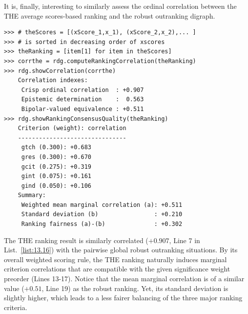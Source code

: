 It is, finally, interesting to similarly assess the ordinal correlation between the THE average scores-based ranking and the robust outranking digraph.
\begin{lstlisting}[caption={Computing the ordinal quality of the THE ranking},label=list:13.16]
>>> # theScores = [(xScore_1,x_1), (xScore_2,x_2),... ]
>>> # is sorted in decreasing order of xscores
>>> theRanking = [item[1] for item in theScores]
>>> corrthe = rdg.computeRankingCorrelation(theRanking)
>>> rdg.showCorrelation(corrthe)
    Correlation indexes:
     Crisp ordinal correlation  : +0.907
     Epistemic determination    :  0.563
     Bipolar-valued equivalence : +0.511
>>> rdg.showRankingConsensusQuality(theRanking)
    Criterion (weight): correlation
    -------------------------------
     gtch (0.300): +0.683
     gres (0.300): +0.670
     gcit (0.275): +0.319
     gint (0.075): +0.161
     gind (0.050): +0.106
    Summary:
     Weighted mean marginal correlation (a): +0.511
     Standard deviation (b)                : +0.210
     Ranking fairness (a)-(b)              : +0.302
\end{lstlisting}

The THE ranking result is similarly correlated ($+0.907$, Line 7 in List.~\ref{list:13.16}) with the pairwise global robust outranking situations. By its overall weighted scoring rule, the THE ranking naturally induces marginal criterion correlations that are compatible with the given significance weight preorder (Lines 13-17). Notice that the mean marginal correlation is of a similar value ($+0.51$, Line 19) as the robust \NetFlows ranking. Yet, its standard deviation is slightly higher, which leads to a less fairer balancing of the three major ranking criteria.

